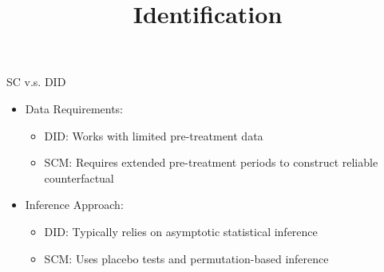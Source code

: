 \documentclass[hyperref={pdfpagelabels=false}]{beamer}
\begin{document}
\begin{frame}{SC v.s. DID}{}
	\begin{itemize}
		
		
		
		
		
		\item Data Requirements:
										\vspace{0.2cm}
		\begin{itemize}
			\item DID: Works with limited pre-treatment data 
											\vspace{0.2cm}
			\item SCM: Requires extended pre-treatment periods to construct reliable counterfactual
		\end{itemize}
		\vspace{0.2cm}
		
		
		\item Inference Approach:
										\vspace{0.2cm}
		\begin{itemize}
			\item DID: Typically relies on asymptotic statistical inference
												\vspace{0.2cm}
			\item SCM: Uses placebo tests and permutation-based inference
		\end{itemize}
		\vspace{0.2cm}
		
		
		
		
	\end{itemize}
\end{frame}





\title[]  
{Identification}


\author 
{}

\institute{}






\date
{}


\begin{frame}{}
	\titlepage
\end{frame}
\end{document}

